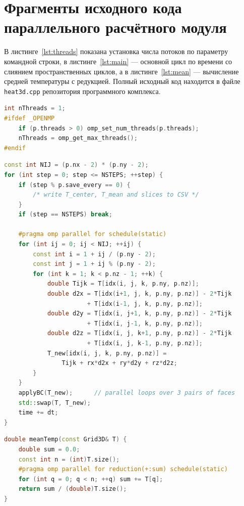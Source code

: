 \chapter{Фрагменты исходного кода параллельного расчётного модуля}
\label{app:code}

В листинге~\ref{lst:threads} показана установка числа потоков по параметру командной строки, в листинге~\ref{lst:main} --- основной цикл по времени со слиянием пространственных циклов, а в листинге~\ref{lst:mean} --- вычисление средней температуры с редукцией. Полный исходный код находится в файле \texttt{heat3d.cpp} репозитория программного комплекса.

\begin{lstlisting}[language=C++, caption={Установка числа потоков OpenMP}, label=lst:threads]
int nThreads = 1;
#ifdef _OPENMP
    if (p.threads > 0) omp_set_num_threads(p.threads);
    nThreads = omp_get_max_threads();
#endif
\end{lstlisting}

\begin{lstlisting}[language=C++, caption={Основной цикл по времени}, label=lst:main]
const int NIJ = (p.nx - 2) * (p.ny - 2);
for (int step = 0; step <= NSTEPS; ++step) {
    if (step % p.save_every == 0) {
        /* write T_center, T_mean and slices to CSV */
    }
    if (step == NSTEPS) break;

    #pragma omp parallel for schedule(static)
    for (int ij = 0; ij < NIJ; ++ij) {
        const int i = 1 + ij / (p.ny - 2);
        const int j = 1 + ij % (p.ny - 2);
        for (int k = 1; k < p.nz - 1; ++k) {
            double Tijk = T[idx(i, j, k, p.ny, p.nz)];
            double d2x = T[idx(i+1, j, k, p.ny, p.nz)] - 2*Tijk
                       + T[idx(i-1, j, k, p.ny, p.nz)];
            double d2y = T[idx(i, j+1, k, p.ny, p.nz)] - 2*Tijk
                       + T[idx(i, j-1, k, p.ny, p.nz)];
            double d2z = T[idx(i, j, k+1, p.ny, p.nz)] - 2*Tijk
                       + T[idx(i, j, k-1, p.ny, p.nz)];
            T_new[idx(i, j, k, p.ny, p.nz)] =
                Tijk + rx*d2x + ry*d2y + rz*d2z;
        }
    }
    applyBC(T_new);      // parallel loops over 3 pairs of faces
    std::swap(T, T_new);
    time += dt;
}
\end{lstlisting}

\begin{lstlisting}[language=C++, caption={Средняя температура по объёму}, label=lst:mean]
double meanTemp(const Grid3D& T) {
    double sum = 0.0;
    const int n = (int)T.size();
    #pragma omp parallel for reduction(+:sum) schedule(static)
    for (int q = 0; q < n; ++q) sum += T[q];
    return sum / (double)T.size();
}
\end{lstlisting}

